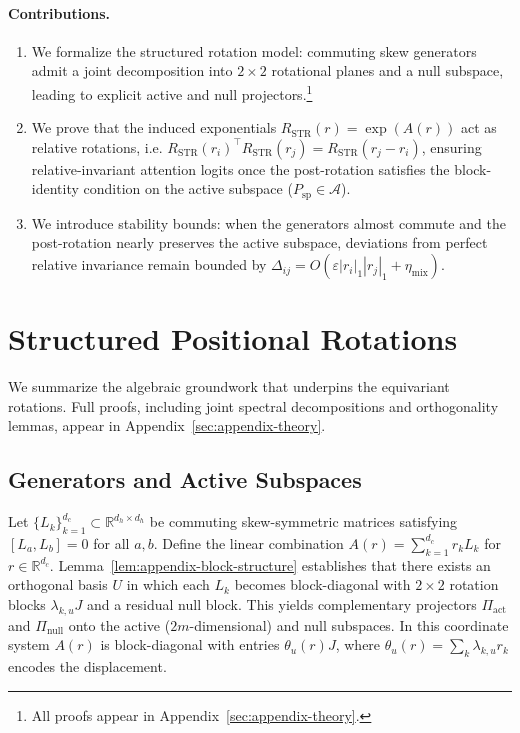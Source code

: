 \documentclass[11pt]{article}
\newcommand{\Real}{\mathbb{R}}
\begin{document}
\paragraph{Contributions.}
\begin{enumerate}[leftmargin=1.5em]
  \item We formalize the structured rotation model: commuting skew generators admit a joint decomposition into $2\times 2$ rotational planes and a null subspace, leading to explicit active and null projectors.\footnote{All proofs appear in Appendix~\ref{sec:appendix-theory}.}
  \item We prove that the induced exponentials $R_{\mathrm{STR}}(r) = \exp(A(r))$ act as relative rotations, i.e. $R_{\mathrm{STR}}(r_i)^\top R_{\mathrm{STR}}(r_j) = R_{\mathrm{STR}}(r_j - r_i)$, ensuring relative-invariant attention logits once the post-rotation satisfies the block-identity condition on the active subspace ($P_{\mathrm{sp}} \in \mathcal{A}$).
  \item We introduce stability bounds: when the generators almost commute and the post-rotation nearly preserves the active subspace, deviations from perfect relative invariance remain bounded by $\Delta_{ij} = O(\varepsilon |r_i|_1 |r_j|_1 + \eta_{\mathrm{mix}})$.

\end{enumerate}

\section{Structured Positional Rotations}
\label{sec:structured-rotations}

We summarize the algebraic groundwork that underpins the equivariant rotations. Full proofs,
including joint spectral decompositions and orthogonality lemmas, appear in Appendix~\ref{sec:appendix-theory}.

\subsection{Generators and Active Subspaces}

Let $\{L_k\}_{k=1}^{d_c} \subset \Real^{d_h \times d_h}$ be commuting skew-symmetric matrices satisfying
$[L_a,L_b] = 0$ for all $a,b$. Define the linear combination $A(r) = \sum_{k=1}^{d_c} r_k L_k$ for
$r \in \Real^{d_c}$. Lemma~\ref{lem:appendix-block-structure} establishes that there exists an orthogonal basis $U$ in which each
$L_k$ becomes block-diagonal with $2\times 2$ rotation blocks $\lambda_{k,u} J$ and a residual null
block. This yields complementary projectors $\Pi_{\mathrm{act}}$ and $\Pi_{\mathrm{null}}$ onto the active
($2m$-dimensional) and null subspaces. In this coordinate system $A(r)$ is block-diagonal with
entries $\theta_u(r) J$, where $\theta_u(r) = \sum_k \lambda_{k,u} r_k$ encodes the displacement.
\end{document}
